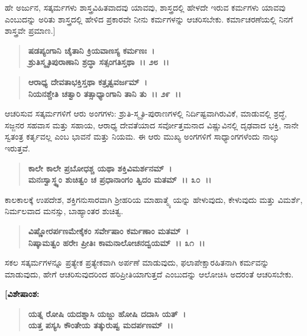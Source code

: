 ಹೇ ಅರ್ಜುನ, ಸತ್ಕರ್ಮಗಳು ಶಾಸ್ತ್ರವಿಹಿತವಾದವು ಯಾವವು, ಶಾಸ್ತ್ರದಲ್ಲಿ ಹೇಳದೇ ಇರುವ ಕರ್ಮಗಳು ಯಾವವು ಎಂಬುದನ್ನು ಅರಿತು ಶಾಸ್ತ್ರದಲ್ಲಿ ಹೇಳಿದ ಪ್ರಕಾರವೇ ನೀನು ಕರ್ಮಗಳನ್ನು ಆಚರಿಸಬೇಕು. ಕರ್ಮಾಚರಣೆಯಲ್ಲಿ ನಿನಗೆ ಶಾಸ್ತ್ರವೇ ಪ್ರಮಾಣ.]

\begin{verse}
\textbf{ಷಡಪ್ಯಂಗಾನಿ ಚೈತಾನಿ ಕ್ರಿಯವಾಣಸ್ಯ ಕರ್ಮಣಃ~।}\\\textbf{ಶ್ರುತಿಸ್ಮೃತಿಪುರಾಣಾನಿ ಶ್ರದ್ಧಾ ಸತ್ಸಂಗತಿಸ್ತಥಾ~।। ೨೮~।। }
\end{verse}

\begin{verse}
\textbf{ಆರಾಧ್ಯ ದೇವತಾಭಕ್ತಿಸ್ತಥಾ ಕತ್ರೃತ್ವವರ್ಜಮ್~।}\\\textbf{ನಿಯನಶ್ಚೇತಿ ಚತ್ವಾರಿ ತತ್ಸಾಧ್ಯಾಂಗಾನಿ ತಾನಿ ತು~।। ೨೯~।।}
\end{verse}

ಆಚರಿಸುವ ಸತ್ಕರ್ಮಗಳಿಗೆ ಆರು ಅಂಗಗಳು: ಶ್ರುತಿ-ಸ್ಮೃತಿ-ಪುರಾಣಗಳಲ್ಲಿ ನಿರ್ದಿಷ್ಟವಾಗಿರುವಿಕೆ, ಮಾಡುವಲ್ಲಿ ಶ್ರದ್ಧೆ, ಸಜ್ಜನರ ಸಹವಾಸ ಮತ್ತು ಸಹಾಯ, ಆರಾಧ್ಯ ದೇವತೆಯಾದ ಸರ್ವೋತ್ತಮನಾದ ವಿಷ್ಣುವಿನಲ್ಲಿ ದೃಢವಾದ ಭಕ್ತಿ, ನಾನೇ ಸ್ವತಂತ್ರ ಕರ್ತೃವಲ್ಲ ಎಂಬ ಭಾವನೆ ಮತ್ತು ನಿಯಮ. ಈ ಆರು ಮುಖ್ಯ ಅಂಗಗಳಿಗೆ ಸಾಧ್ಯಾಂಗಗಳೆಂದು ನಾಲ್ಕು ಇರುತ್ತವೆ.

\begin{verse}
\textbf{ಕಾಲೇ ಕಾಲೇ ಪ್ರಬೋಧಶ್ಚ ಯಥಾ ಶಕ್ತಿವಿಮರ್ಶನಮ್~।}\\\textbf{ಮನಃಸ್ವಾಸ್ಥ್ಯಂ ಶುಚಿತ್ವಂ ಚ ಪ್ರಧಾನಾಂಗಂ ತ್ವಿದಂ ಮತಮ್~।। ೩೦~।।}
\end{verse}

ಕಾಲಕಾಲಕ್ಕೆ ಉಪದೇಶ, ಶಕ್ತಿಗನುಸಾರವಾಗಿ ಶ‍್ರೀಹರಿಯ ಮಾಹಾತ್ಮ್ಯೆ ಯನ್ನು ಹೇಳುವುದು, ಕೇಳುವುದು ಮತ್ತು ವಿಮರ್ಶೆ, ನಿರ್ಮಲವಾದ ಮನಸ್ಸು, ಬಾಹ್ಯಾಂತರ ಶುಚಿತ್ವ.

\begin{verse}
\textbf{ವಿಷ್ಣೋರರ್ಪಣಮೇಕೈಕಂ ಸರ್ವೇಷಾಂ ಕರ್ಮಣಾಂ ಮತಮ್~।}\\\textbf{ನಿಷ್ಕಾಮತ್ವಂ ಹರೇಃ ಪ್ರೀತಿಃ ಕಾಮನಾಲೋಚನದ್ವಯಮ್~।। ೩೧~।।}
\end{verse}

ಸಕಲ ಸತ್ಕರ್ಮಗಳನ್ನೂ ಪ್ರತ್ಯೇಕ ಪ್ರತ್ಯೇಕವಾಗಿ ಅರ್ಪಣೆ ಮಾಡುವುದು, ಫಲಾಪೇಕ್ಷಾರಹಿತನಾಗಿ ಕರ್ಮವನ್ನು ಮಾಡುವುದು, ಹೇಗೆ ಆಚರಿಸುವುದರಿಂದ ಹರಿಪ್ರೀತಿಯಾಗುತ್ತದೆ ಎಂಬುದನ್ನು ಆಲೋಚಿಸಿ ಅದರಂತೆ ಆಚರಿಸಬೇಕು.

\begin{flushleft}
\textbf{[ವಿಶೇಷಾಂಶ:}
\end{flushleft}

\begin{verse}
\textbf{ಯತ್ನ ರೋಷಿ ಯದಶ್ನಾಸಿ ಯಜ್ಜು ಹೋಷಿ ದದಾಸಿ ಯತ್~।}\\\textbf{ಯತ್ತ ಪಸ್ಯಸಿ ಕೌಂತೇಯ ತತ್ಕುರುಷ್ವ ಮದರ್ಪಣಮ್~।।} 
\end{verse}

